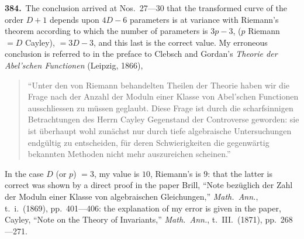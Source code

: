 \documentclass[11pt,a4paper]{article}
\theoremstyle{plain}
\theoremstyle{definition}
\theoremstyle{remark}
\begin{document}
\smallskip

\noindent\textbf{384.}\ The conclusion arrived at Nos.~27---30 that the transformed curve of the order $D+1$ depends upon $4D-6$ parameters is at variance with Riemann's theorem according to which the number of parameters is $3p-3$, ($p$ Riemann $=D$ Cayley), $=3D-3$, and this last is the correct value. My erroneous conclusion is referred to in the preface to Clebsch and Gordan's \textit{Theorie der Abel'schen Functionen} (Leipzig, 1866),

\begin{quotation}
\small``Unter den von Riemann behandelten Theilen der Theorie haben wir die Frage nach der Anzahl der Moduln einer Klasse von Abel'schen Functionen ausschliessen zu m\"{u}ssen geglaubt. Diese Frage ist durch die scharfsinnigen Betrachtungen des Herrn Cayley Gegenstand der Controverse geworden: sie ist \"{u}berhaupt wohl zun\"{a}chst nur durch tiefe algebraische Untersuchungen endg\"{u}ltig zu entscheiden, f\"{u}r deren Schwierigkeiten die gegenw\"{a}rtig bekannten Methoden nicht mehr auszureichen scheinen.''
\end{quotation}

In the case $D$ (or $p$) $=3$, my value is $10$, Riemann's is $9$: that the latter is correct was shown by a direct proof in the paper Brill, ``Note bez\"{u}glich der Zahl der Moduln einer Klasse von algebraischen Gleichungen,'' \textit{Math.\ Ann.}, t.~i.\ (1869), pp.~401---406: the explanation of my error is given in the paper, Cayley, ``Note on the Theory of Invariants,'' \textit{Math.\ Ann.}, t.~III.\ (1871), pp.~268---271.

\smallskip
\end{document}
